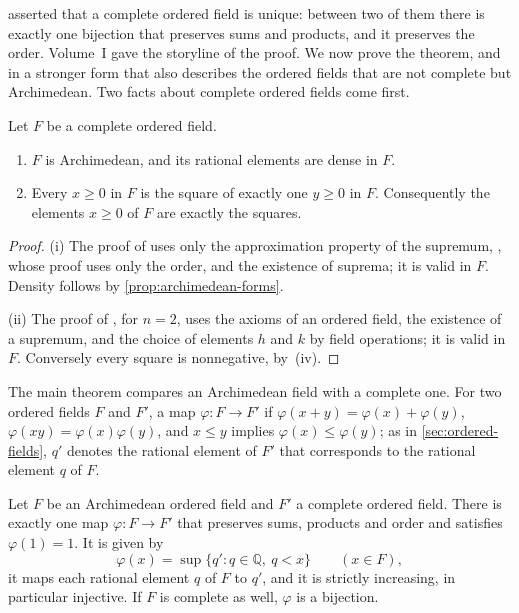  asserted that a complete ordered field is unique: between two of them there is exactly one bijection that preserves sums and products, and it preserves the order. Volume~I gave the storyline of the proof. We now prove the theorem, and in a stronger form that also describes the ordered fields that are not complete but Archimedean. Two facts about complete ordered fields come first.

\begin{lemma}
\label{lem:complete-basic}
Let $F$ be a complete ordered field.
\begin{enumerate}
\item $F$ is Archimedean, and its rational elements are dense in $F$.
\item Every $x\ge0$ in $F$ is the square of exactly one $y\ge0$ in $F$. Consequently the elements $x\ge0$ of $F$ are exactly the squares.
\end{enumerate}
\end{lemma}

\begin{proof}
(i) The proof of  uses only the approximation property of the supremum, , whose proof uses only the order, and the existence of suprema; it is valid in $F$. Density follows by \cref{prop:archimedean-forms}.

(ii) The proof of , for $n=2$, uses the axioms of an ordered field, the existence of a supremum, and the choice of elements $h$ and $k$ by field operations; it is valid in $F$. Conversely every square is nonnegative, by \,(iv).
\end{proof}

The main theorem compares an Archimedean field with a complete one. For two ordered fields $F$ and $F'$, a map $\varphi\colon F\to F'$  if $\varphi(x+y)=\varphi(x)+\varphi(y)$, $\varphi(xy)=\varphi(x)\varphi(y)$, and $x\le y$ implies $\varphi(x)\le\varphi(y)$; as in \cref{sec:ordered-fields}, $q'$ denotes the rational element of $F'$ that corresponds to the rational element $q$ of $F$.

\begin{theorem}
\label{thm:archimedean-embedding}
Let $F$ be an Archimedean ordered field and $F'$ a complete ordered field. There is exactly one map $\varphi\colon F\to F'$ that preserves sums, products and order and satisfies $\varphi(1)=1$. It is given by
\begin{equation}
\varphi(x)=\sup\{q': q\in\mathbb Q,\ q<x\}\qquad(x\in F),
\label{eq:embedding-sup}
\end{equation}
it maps each rational element $q$ of $F$ to $q'$, and it is strictly increasing, in particular injective. If $F$ is complete as well, $\varphi$ is a bijection.
\end{theorem}

